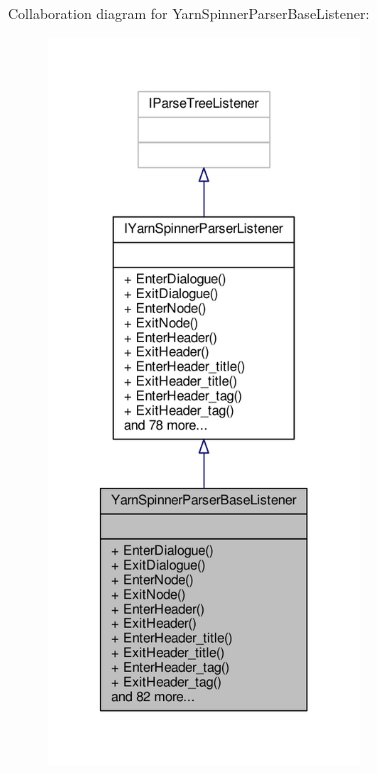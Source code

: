 Collaboration diagram for Yarn\-Spinner\-Parser\-Base\-Listener\-:
\nopagebreak
\begin{figure}[H]
\begin{center}
\leavevmode
\includegraphics[width=234pt]{a00400}
\end{center}
\end{figure}
